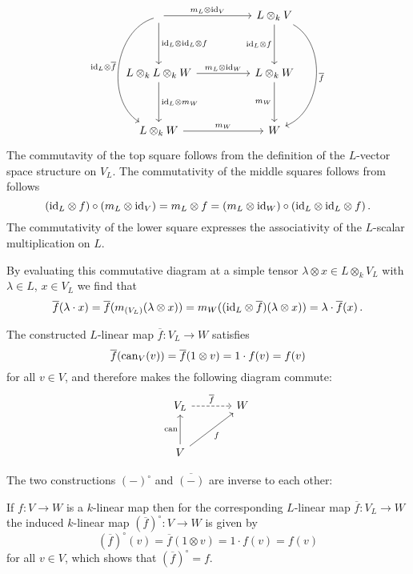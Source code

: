\begin{fluff}
\begin{itemize}
\[\begin{tikzcd}[sep = huge]
            \arrow{r}[above]{m_L \otimes {\id_V}}
            \arrow{d}[right]{{\id_L} \otimes {\id_L} \otimes f}
            \arrow[bend right = 65]{dd}[left]{{\id_L} \otimes \overline{f}}
          & L \otimes_k V
            \arrow{d}[left]{{\id_L} \otimes f}
            \arrow[bend left = 65]{dd}[right]{\overline{f}}
          \\
            L \otimes_k L \otimes_k W
            \arrow{r}[above]{m_L \otimes \id_W}
            \arrow{d}[right]{{\id_L} \otimes m_W}
          & L \otimes_k W
            \arrow{d}[left]{m_W}
          \\
            L \otimes_k W
            \arrow{r}[above]{m_W}
          & W
        \end{tikzcd}
      \]
      The commutavity of the top square follows from the definition of the $L$-vector space structure on $V_L$.
      The commutativity of the middle squares follows from follows
      \[
          ({\operatorname{id}_L} \otimes f) \circ (m_L \otimes \operatorname{id}_V)
        = m_L \otimes f
        = (m_L \otimes \operatorname{id}_W) \circ ({\operatorname{id}_L} \otimes {\operatorname{id}_L} \otimes f) \,.
      \]
      The commutativity of the lower square expresses the associativity of the $L$-scalar multiplication on $L$.
      
      By evaluating this commutative diagram at a simple tensor $\lambda \otimes x \in L \otimes_k V_L$ with $\lambda \in L$, $x \in V_L$ we find that
      \begin{align*}
          \overline{f}(\lambda \cdot x)
        = \overline{f}( m_{(V_L)}(\lambda \otimes x) )
        = m_W( ({\operatorname{id}_L} \otimes \overline{f})(\lambda \otimes x) )
        = \lambda \cdot \overline{f}(x) \,.
      \end{align*}
  \end{itemize}
  The constructed $L$-linear map $\overline{f} \colon V_L \to W$ satisfies
  \[
      \overline{f}(\operatorname{can}_V(v))
    = \overline{f}(1 \otimes v)
    = 1 \cdot f(v)
    = f(v)
  \]
  for all $v \in V$, and therefore makes the following diagram commute:
    \[
      \begin{tikzcd}[sep = large]
          V_L
          \arrow[dashed]{r}[above]{\overline{f}}
        & W
        \\
          V
          \arrow{u}[left]{\can}
          \arrow{ru}[below right]{f}
        & {}
      \end{tikzcd}
    \]

  The two constructions $(-)^\circ$ and $\overline{(-)}$ are inverse to each other:
  
  If $f \colon V \to W$ is a $k$-linear map then for the corresponding $L$-linear map $\overline{f} \colon V_L \to W$ the induced $k$-linear map $(\overline{f})^\circ \colon V \to W$ is given by
  \[
      (\overline{f})^\circ(v)
    = \overline{f}(1 \otimes v)
    = 1 \cdot f(v)
    = f(v)
  \]
  for all $v \in V$, which shows that $(\overline{f})^\circ = f$.
  

\end{fluff}
